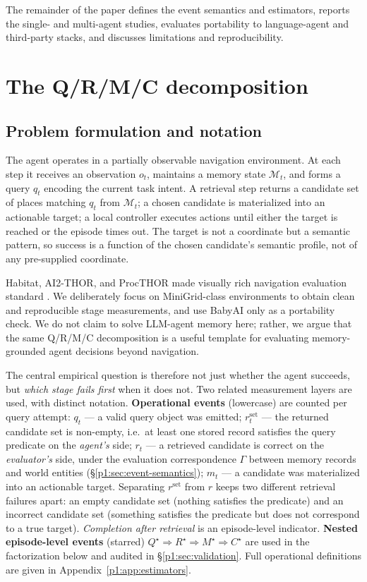 \documentclass{article}
\begin{document}
The remainder of the paper defines the event semantics and estimators,
reports the single- and multi-agent studies, evaluates portability to
language-agent and third-party stacks, and discusses limitations and
reproducibility.

\section{The Q/R/M/C decomposition}
\label{p1:sec:framework}

\subsection{Problem formulation and notation}
\label{p1:sec:notation}

The agent operates in a partially observable navigation environment.
At each step it receives an observation $o_t$, maintains a memory
state $\mathcal{M}_t$, and forms a query $q_t$ encoding the current
task intent. A retrieval step returns a candidate set of places
matching $q_t$ from $\mathcal{M}_t$; a chosen candidate is
materialized into an actionable target; a local controller executes
actions until either the target is reached or the episode times out.
The target is not a coordinate but a semantic pattern, so success is a
function of the chosen candidate's semantic profile, not of any
pre-supplied coordinate.

Habitat, AI2-THOR, and ProcTHOR made visually rich navigation
evaluation standard
\citep{savva2019habitat,kolve2017ai2thor,deitke2022procthor}. We
deliberately focus on MiniGrid-class environments to obtain clean and
reproducible stage measurements, and use BabyAI only as a portability
check. We do not claim to solve LLM-agent memory here; rather, we
argue that the same Q/R/M/C decomposition is a useful template for
evaluating memory-grounded agent decisions beyond navigation.

The central empirical question is therefore not just whether the agent
succeeds, but \emph{which stage fails first} when it does not. Two
related measurement layers are used, with distinct notation.
\textbf{Operational events} (lowercase) are counted per query attempt:
$q_t$ --- a valid query object was emitted; $r^{\mathrm{set}}_t$ ---
the returned candidate set is non-empty, i.e.\ at least one stored
record satisfies the query predicate on the \emph{agent's} side;
$r_t$ --- a retrieved candidate is correct on the \emph{evaluator's}
side, under the evaluation correspondence $\Gamma$ between memory
records and world entities (\S\ref{p1:sec:event-semantics});
$m_t$ --- a candidate was materialized into an actionable target.
Separating $r^{\mathrm{set}}$ from $r$ keeps two different retrieval
failures apart: an empty candidate set (nothing satisfies the
predicate) and an incorrect candidate set (something satisfies the
predicate but does not correspond to a true target).
\emph{Completion after retrieval} is an episode-level indicator.
\textbf{Nested episode-level events} (starred)
$Q^\star \Rightarrow R^\star \Rightarrow M^\star \Rightarrow C^\star$
are used in the factorization below and audited in
\S\ref{p1:sec:validation}. Full operational definitions are given in
Appendix~\ref{p1:app:estimators}.
\end{document}
